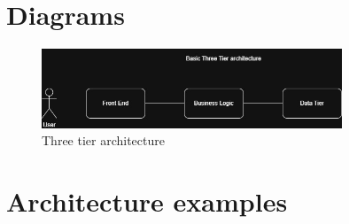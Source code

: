 \documentclass[a4paper, 11pt]{book}
\begin{document}
    \chapter{Diagrams}

    \begin{figure}[h]
        \centering
        \includegraphics[width=0.8\textwidth]{basic-architecture} %
        \caption{Three tier architecture}
        \label{fig:drawio-diagram}
    \end{figure}


    \chapter{Architecture examples}
\end{document}
